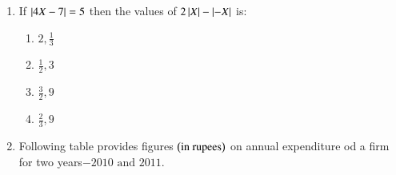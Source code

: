 \documentclass[journal]{IEEEtran}
\begin{document}
\begin{enumerate}
\item If $\left\vert4X - 7\right\vert = 5$ then the values of $2\left\vert X\right\vert - \left\vert-X\right\vert$ is:
\begin{multicols}{4}
\begin{enumerate}
    \item $2,\frac{1}{3}$
    \item $\frac{1}{2},3$
    \item $\frac{3}{2},9$
    \item $\frac{2}{3},9$
\end{enumerate}
\end{multicols}
\item Following table provides figures $\left(\text{in rupees}\right)$ on annual expenditure od a firm for two years$-2010 \text{ and } 2011$.\\


\end{enumerate}
\end{document}
